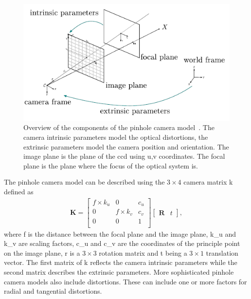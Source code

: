 \begin{figure}[htb]
    \centering
    \includegraphics[width=\textwidth]{doc/thesis/0_figures/sfm/pinholeCamera.png}
    \caption{Overview of the components of the pinhole camera model~\cite{openMVG}. The camera intrinsic parameters model the optical distortions, the extrinsic parameters model the camera position and orientation. The image plane is the plane of the \gls{ccd} using u,v coordinates. The focal plane is the plane where the focus of the optical system is.}
    \label{fig:pinhole_cam}
\end{figure} 

The pinhole camera model can be described using the $3\times4$ camera matrix \gls{k} defined as
\begin{align}
    \textbf{K} = \begin{bmatrix}
        f\times k_u & 0           & c_u \\
        0           & f\times k_v & c_v \\
        0           & 0           & 1   \\
    \end{bmatrix} 
    \begin{bmatrix}
        \textbf{R} & t
    \end{bmatrix}, \label{eq:camera_m}
\end{align}
where \gls{f} is the distance between the focal plane and the image plane, \gls{k_u} and \gls{k_v} are scaling factors, \gls{c_u} and \gls{c_v} are the coordinates of the principle point on the image plane, \gls{r} is a $3\times3$ rotation matrix and \gls{t} being a $3\times1$ translation vector. The first matrix of \gls{k} reflects the camera intrinsic parameters while the second matrix describes the extrinsic parameters.
More sophisticated pinhole camera models also include distortions. These can include one or more factors for radial and tangential distortions.

